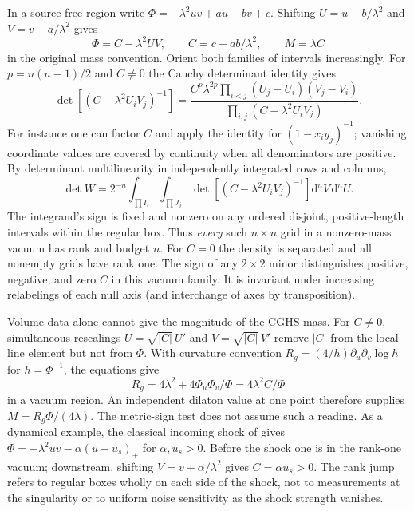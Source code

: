 \documentclass[11pt,letterpaper]{article}
\newcommand{\dd}{\mathrm{d}}
\begin{document}
In a source-free region write $\Phi=-\lambda^2uv+a u+b v+c$. Shifting $U=u-b/\lambda^2$ and $V=v-a/\lambda^2$ gives
\begin{equation}
 \Phi=C-\lambda^2 UV,\qquad C=c+ab/\lambda^2 ,\qquad M=\lambda C
 \label{eq:cghsvac}
\end{equation}
in the original mass convention. Orient both families of intervals increasingly. For $p=n(n-1)/2$ and $C\ne0$ the Cauchy determinant identity gives
\begin{equation}
 \det\!\left[(C-\lambda^2 U_i V_j)^{-1}\right]
   =\frac{C^p\lambda^{2p}
      \prod_{i<j}(U_j-U_i)(V_j-V_i)}
     {\prod_{i,j}(C-\lambda^2 U_iV_j)} .
 \label{eq:cauchy}
\end{equation}
For instance one can factor $C$ and apply the identity for $(1-x_i y_j)^{-1}$; vanishing coordinate values are covered by continuity when all denominators are positive. By determinant multilinearity in independently integrated rows and columns,
\begin{equation}
 \det W=2^{-n}\int_{\prod I_i}\int_{\prod J_j}
       \det\!\left[(C-\lambda^2U_i V_j)^{-1}\right]
       \dd^n V\,\dd^n U .
\end{equation}
The integrand's sign is fixed and nonzero on any ordered disjoint, positive-length intervals within the regular box. Thus \emph{every} such $n\times n$ grid in a nonzero-mass vacuum has rank and budget $n$. For $C=0$ the density is separated and all nonempty grids have rank one. The sign of any $2\times2$ minor distinguishes positive, negative, and zero $C$ in this vacuum family. It is invariant under increasing relabelings of each null axis (and interchange of axes by transposition).

Volume data alone cannot give the magnitude of the CGHS mass. For $C\ne0$, simultaneous rescalings $U=\sqrt{|C|}\,U'$ and $V=\sqrt{|C|}\,V'$ remove $|C|$ from the local line element but not from $\Phi$. With curvature convention $R_g=(4/h)\partial_u\partial_v\log h$ for $h=\Phi^{-1}$, the equations give
\begin{equation}
 R_g=4\lambda^2+4\Phi_u\Phi_v/\Phi
     =4\lambda^2 C/\Phi
\end{equation}
in a vacuum region. An independent dilaton value at one point therefore supplies $M=R_g\Phi/(4\lambda)$. The metric-sign test does not assume such a reading. As a dynamical example, the classical incoming shock of \cite[eq.~(13)]{CGHS} gives $\Phi=-\lambda^2uv-\alpha(u-u_s)_+$ for $\alpha,u_s>0$. Before the shock one is in the rank-one vacuum; downstream, shifting $V=v+\alpha/\lambda^2$ gives $C=\alpha u_s>0$. The rank jump refers to regular boxes wholly on each side of the shock, not to measurements at the singularity or to uniform noise sensitivity as the shock strength vanishes.
\end{document}
